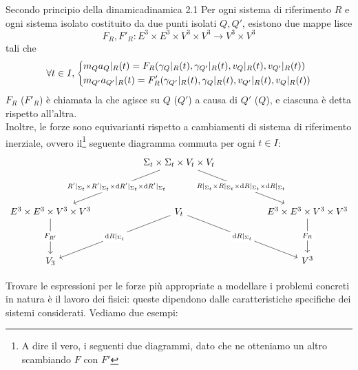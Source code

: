 \documentclass[openany]{book}
\begin{document}
\begin{axiom}{Secondo principio della dinamica}{dinamica 2.1}
    Per ogni sistema di riferimento $R$ e ogni sistema isolato costituito da due punti isolati $Q,Q'$, esistono due mappe lisce 
    \[ F_R, F'_R : E^3\times E^3 \times V^3\times V^3 \to V^3 \times V^3 \] tali che 
    \[ \forall t \in I, \begin{dcases}
        m_Q a_Q|_R(t) = F_R(\gamma_Q|_R(t), \gamma_{Q'}|_R(t), v_Q|_R(t), v_{Q'}|_R(t))\\
        m_{Q'} a_{Q'}|_R(t) = F'_R(\gamma_{Q'}|_R(t), \gamma_{Q}|_R(t), v_{Q'}|_R(t), v_{Q}|_R(t))
    \end{dcases}\]
    $F_R$ ($F'_R$) è chiamata la  che agisce su $Q$ ($Q'$) a causa di $Q'$ ($Q$), e ciascuna è detta  rispetto all'altra.\\
    Inoltre, le forze sono equivarianti rispetto a cambiamenti di sistema di riferimento inerziale, ovvero il\footnote{A dire il vero, i seguenti due diagrammi, dato che ne otteniamo un altro scambiando $F$ con $F'$} seguente diagramma commuta per ogni $t \in I$:
    \[\begin{tikzcd}
    	&& {\Sigma_t\times\Sigma_t \times V_t\times V_t} && \\
	    \\
	    {E^3\times E^3\times V^3\times V^3} && {V_t} && {E^3\times E^3\times V^3\times V^3} \\
	    \\
	    {V_3} &&&& {V^3}
	    \arrow["{R'|_{\Sigma_t}\times R'|_{\Sigma_t} \times \di R'|_{\Sigma_t} \times \di R'|_{\Sigma_t}}"{description}, from=1-3, to=3-1]
    	\arrow["{R|_{\Sigma_t}\times R|_{\Sigma_t} \times \di R|_{\Sigma_t} \times \di R|_{\Sigma_t}}"{description}, from=1-3, to=3-5]
	    \arrow["{F_{R'}}"{description}, from=3-1, to=5-1]
	    \arrow["{\di R|_{\Sigma_t}}"{description}, from=3-3, to=5-1]
    	\arrow["{\di R|_{\Sigma_t}}"{description}, from=3-3, to=5-5]
	    \arrow["{F_R}"{description}, from=3-5, to=5-5]
    \end{tikzcd}\]
\end{axiom}

Trovare le espressioni per le forze più appropriate a modellare i problemi concreti in natura è il lavoro dei fisici: queste dipendono dalle caratteristiche specifiche dei sistemi considerati. Vediamo due esempi:
\end{document}
